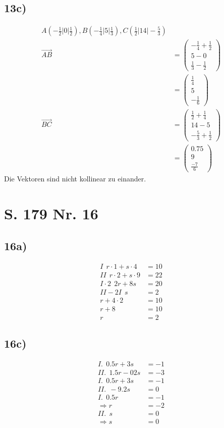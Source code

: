 \documentclass[12pt,a4paper]{report}
\begin{document}
	\subsection{13c)}
	\begin{align*}
		A(-\frac{1}{2}|0|\frac{1}{2}), B(-\frac{1}{4}|5|\frac{1}{3}), C(\frac{1}{2}|14|-\frac{5}{3}) \\
		\overrightarrow{AB} &= \begin{pmatrix}
			-\frac{1}{4} + \frac{1}{2} \\
			5 - 0 \\
			\frac{1}{3} - \frac{1}{2}
		\end{pmatrix} \\
		&= \begin{pmatrix}
			\frac{1}{4} \\
			5 \\
			-\frac{1}{6}
		\end{pmatrix}
		\\
		\overrightarrow{BC}&=\begin{pmatrix}
			\frac{1}{2} + \frac{1}{4} \\
			14 - 5 \\
			-\frac{5}{3} + \frac{1}{2}
		\end{pmatrix} \\
		&=\begin{pmatrix}
			0.75 \\
			9 \\
			\frac{-7}{6}
		\end{pmatrix}
	\end{align*}
	Die Vektoren sind nicht kollinear zu einander.
	
	\section{S. 179 Nr. 16}
	\subsection{16a)}
	\begin{align*}
		I\ \ r\cdot 1 + s \cdot 4 &= 10 \\
		II\ \ r \cdot 2 + s \cdot 9 &= 22 \\
		I\cdot 2\ \ 2r + 8s &= 20 \\
		II-2I\ \ s &= 2 \\
		r + 4\cdot 2 &= 10 \\
		r + 8 &= 10 \\
		r &= 2
	\end{align*}
	\subsection{16c)}
	\begin{align*}
		I.\ \ 0.5r + 3s &= -1 \\
		II.\ \ 1.5r - 02s &= -3 \\
		I.\ \ 0.5r + 3s &= -1 \\
		II.\ \ -9.2s &= 0 \\
		I.\ \ 0.5r &= -1 \\
		\Rightarrow r&=-2 \\
		II.\ \ s &= 0 \\
		\Rightarrow s &=0
	\end{align*}
\end{document}
